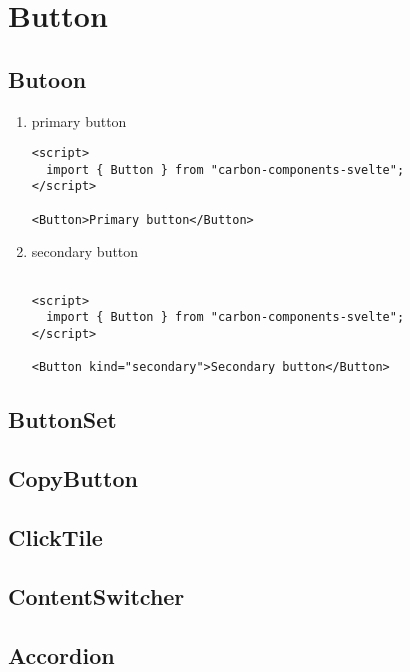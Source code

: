 \documentclass[11pt]{article}
\author{Jeason}
\date{\today}
\title{}
\begin{document}
\tableofcontents

\section{Button}
\label{sec:org18562df}
\subsection{Butoon}
\label{sec:org346fb8d}
\begin{enumerate}
\item primary button
\label{sec:org4aa6162}
\begin{verbatim}
<script>
  import { Button } from "carbon-components-svelte";
</script>

<Button>Primary button</Button>

\end{verbatim}

\item secondary button
\label{sec:org405041b}

\begin{verbatim}

<script>
  import { Button } from "carbon-components-svelte";
</script>

<Button kind="secondary">Secondary button</Button>

\end{verbatim}
\end{enumerate}



\subsection{ButtonSet}
\label{sec:orgf468674}
\subsection{CopyButton}
\label{sec:org1f8d413}
\subsection{ClickTile}
\label{sec:org6883054}
\subsection{ContentSwitcher}
\label{sec:org2bb95c9}
\subsection{Accordion}
\label{sec:org9af6288}
\end{document}
